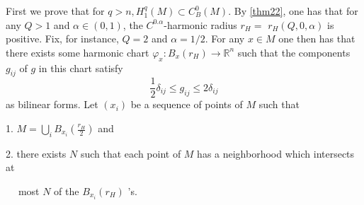 \documentclass[12pt,hyperref,a4paper,UTF8]{ctexart}
\begin{document}
\begin{Proof}
First we prove that for $q>n, H_1^q(M) \subset C_B^0(M)$. By \autoref{thm22}, one has that for any $Q>1$ and $\alpha \in(0,1)$, the $C^{0 . \alpha}$-harmonic radius $r_H=$ $r_H(Q, 0, \alpha)$ is positive. Fix, for instance, $Q=2$ and $\alpha=1 / 2$. For any $x \in M$ one then has that there exists some harmonic chart $\varphi_x: B_x\left(r_H\right) \rightarrow \mathbb{R}^n$ such that the components $g_{i j}$ of $g$ in this chart satisfy
$$
\frac{1}{2} \delta_{i j} \leq g_{i j} \leq 2 \delta_{i j}
$$
as bilinear forms. Let $\left(x_i\right)$ be a sequence of points of $M$ such that

1. $M=\bigcup_i B_{x_i}\left(\frac{r_H}{2}\right)$ and

2. there exists $N$ such that each point of $M$ has a neighborhood which intersects at 

$\quad\;$most $N$ of the $B_{x_i}\left(r_H\right)$ 's.


\end{Proof}
\end{document}
